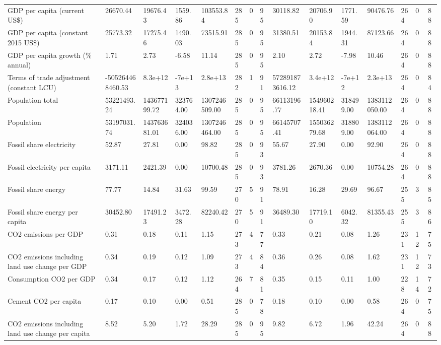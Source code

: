 \begin{longtable}{lllllllllllllll}
GDP per capita (current US\$) & 26670.44 & 19676.43 & 1559.86 & 103553.84 & 285 & 0 & 95 & 30118.82 & 20706.90 & 1771.59 & 90476.76 & 264 & 0 & 88\\
GDP per capita (constant 2015 US\$) & 25773.32 & 17275.46 & 1490.03 & 73515.91 & 285 & 0 & 95 & 31380.51 & 20153.84 & 1944.31 & 87123.66 & 264 & 0 & 88\\
GDP per capita growth (\% annual) & 1.71 & 2.73 & -6.58 & 11.14 & 285 & 0 & 95 & 2.10 & 2.72 & -7.98 & 10.46 & 264 & 0 & 88\\
\addlinespace
Terms of trade adjustment (constant LCU) & -505264468460.53 & 8.3e+12 & -7e+13 & 2.8e+13 & 282 & 1 & 91 & 572891873616.12 & 3.4e+12 & -7e+12 & 2.3e+13 & 264 & 0 & 84\\
Population total & 53221493.24 & 143677199.72 & 323764.00 & 1307246509.00 & 285 & 0 & 95 & 66113196.77 & 154960218.41 & 318499.00 & 1383112050.00 & 264 & 0 & 88\\
Population & 53197031.74 & 143763681.01 & 324036.00 & 1307246464.00 & 285 & 0 & 95 & 66145707.41 & 155036279.68 & 318809.00 & 1383112064.00 & 264 & 0 & 88\\
Fossil share electricity & 52.87 & 27.81 & 0.00 & 98.82 & 285 & 0 & 93 & 55.67 & 27.90 & 0.00 & 92.90 & 264 & 0 & 88\\
Fossil electricity per capita & 3171.11 & 2421.39 & 0.00 & 10700.48 & 285 & 0 & 93 & 3781.26 & 2670.36 & 0.00 & 10754.28 & 264 & 0 & 88\\
\addlinespace
Fossil share energy & 77.77 & 14.84 & 31.63 & 99.59 & 270 & 5 & 91 & 78.91 & 16.28 & 29.69 & 96.67 & 255 & 3 & 85\\
Fossil share energy per capita & 30452.80 & 17491.23 & 3472.28 & 82240.42 & 270 & 5 & 91 & 36489.30 & 17719.10 & 6042.32 & 81355.43 & 255 & 3 & 86\\
CO2 emissions per GDP & 0.31 & 0.18 & 0.11 & 1.15 & 273 & 4 & 77 & 0.33 & 0.21 & 0.08 & 1.26 & 231 & 12 & 75\\
CO2 emissions including land use change per GDP & 0.34 & 0.19 & 0.12 & 1.09 & 273 & 4 & 84 & 0.36 & 0.26 & 0.08 & 1.62 & 231 & 12 & 73\\
Consumption CO2 per GDP & 0.34 & 0.17 & 0.12 & 1.12 & 264 & 7 & 81 & 0.35 & 0.15 & 0.11 & 1.00 & 228 & 14 & 72\\
\addlinespace
Cement CO2 per capita & 0.17 & 0.10 & 0.00 & 0.51 & 285 & 0 & 78 & 0.18 & 0.10 & 0.00 & 0.58 & 264 & 0 & 75\\
CO2 emissions including land use change per capita & 8.52 & 5.20 & 1.72 & 28.29 & 285 & 0 & 95 & 9.82 & 6.72 & 1.96 & 42.24 & 264 & 0 & 88\\

\end{longtable}
